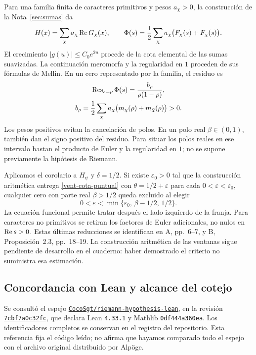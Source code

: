 Para una familia finita de caracteres primitivos y pesos $a_\chi>0$,
la construcción de la Nota~\ref{sec:sumas} da
\[
 H(x)=\sum_\chi a_\chi\operatorname{Re} G_\chi(x),\qquad
 \Phi(s)=\frac12\sum_\chi a_\chi
 \bigl(F_\chi(s)+F_{\bar\chi}(s)\bigr).
\]
El crecimiento $|g(u)|\le C_0e^{2u}$ procede de la cota elemental de las
sumas suavizadas. La continuación meromorfa y la regularidad en $1$
proceden de sus fórmulas de Mellin. En un cero representado por la
familia, el residuo es
\begin{equation}
 \begin{gathered}
 \operatorname{Res}_{s=\rho}\Phi(s)=\frac{b_\rho}{\rho(1-\rho)},\\
 b_\rho=\frac12\sum_\chi a_\chi
 \bigl(m_\chi(\rho)+m_{\bar\chi}(\rho)\bigr)>0.
 \end{gathered}
 \label{vent-residuo-familia}
\end{equation}
Los pesos positivos evitan la cancelación de polos. En un polo real
$\beta\in(0,1)$, también dan el signo positivo del residuo.
Para situar los polos reales en ese intervalo bastan el producto
de Euler y la regularidad en $1$; no se supone previamente la
hipótesis de Riemann.

Aplicamos el corolario a $H_\psi$ y $\delta=1/2$.
Si existe $\varepsilon_0>0$ tal que la construcción aritmética entrega
\eqref{vent-cota-puntual} con $\theta=1/2+\varepsilon$ para cada
$0<\varepsilon<\varepsilon_0$, cualquier cero con parte real
$\beta>1/2$ queda excluido al elegir
\[
 0<\varepsilon<\min\{\varepsilon_0,\,\beta-1/2,\,1/2\}.
\]
La ecuación funcional permite tratar después el lado izquierdo de la
franja. Para caracteres no primitivos se retiran los factores de Euler
adicionales, no nulos en $\operatorname{Re} s>0$. Estas últimas reducciones se
identifican en A, pp.~6--7, y B, Proposición~2.3, pp.~18--19.
La construcción aritmética de las ventanas sigue pendiente de desarrollo
en el cuaderno: haber demostrado el criterio no suministra esa estimación.

\subsection{Concordancia con Lean y alcance del cotejo}

Se consultó el espejo
\href{https://github.com/CocoSgt/riemann-hypothesis-lean/tree/7cbf7a0c32fca1badf05931879a37c3f8a2b03b4}
{\texttt{CocoSgt/riemann-hypothesis-lean}},
en la revisión
\href{https://github.com/CocoSgt/riemann-hypothesis-lean/tree/7cbf7a0c32fca1badf05931879a37c3f8a2b03b4}
{\texttt{7cbf7a0c32fc}},
que declara Lean \texttt{4.33.1} y Mathlib
\texttt{0df444a360ea}. Los identificadores completos se conservan en
el registro del repositorio. Esta referencia fija el código leído;
no afirma que hayamos comparado todo el espejo con el archivo original
distribuido por Alpöge.

